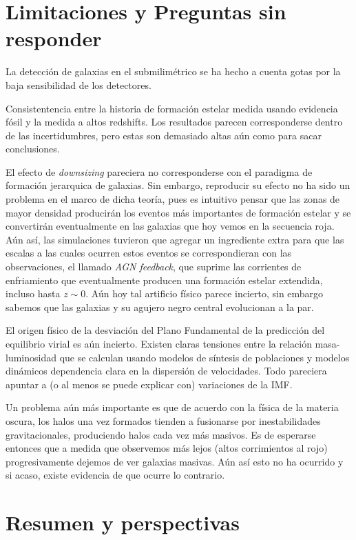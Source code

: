 \documentclass[a4paper,twoside]{article}
\begin{document}
\section{Limitaciones y Preguntas sin responder}

La detección de galaxias en el submilimétrico se ha hecho a cuenta gotas por la baja sensibilidad de los detectores.

Consistentencia entre la historia de formación estelar medida usando evidencia fósil y la medida a altos redshifts. Los resultados parecen corresponderse dentro de las incertidumbres, pero estas son demasiado altas aún como para sacar conclusiones.

El efecto de \emph{downsizing} pareciera no corresponderse con el paradigma de formación jerarquica de galaxias. Sin embargo, reproducir su efecto no ha sido un problema en el marco de dicha teoría, pues es intuitivo pensar que las zonas de mayor densidad producirán los eventos más importantes de formación estelar y se convertirán eventualmente en las galaxias que hoy vemos en la secuencia roja. Aún así, las simulaciones tuvieron que agregar un ingrediente extra para que las escalas a las cuales ocurren estos eventos se correspondieran con las observaciones, el llamado \emph{AGN feedback}, que suprime las corrientes de enfriamiento que eventualmente producen una formación estelar extendida, incluso hasta $z\sim0$. Aún hoy tal artificio físico parece incierto, sin embargo sabemos que las galaxias y su agujero negro central evolucionan a la par.

El origen físico de la desviación del Plano Fundamental de la predicción del equilibrio virial es aún incierto. Existen claras tensiones entre la relación masa-luminosidad que se calculan usando modelos de síntesis de poblaciones y modelos dinámicos dependencia clara en la dispersión de velocidades. Todo pareciera apuntar a (o al menos se puede explicar con) variaciones de la IMF.

Un problema aún más importante es que de acuerdo con la física de la materia oscura, los halos una vez formados tienden a fusionarse por inestabilidades gravitacionales, produciendo halos cada vez más masivos. Es de esperarse entonces que a medida que observemos más lejos (altos corrimientos al rojo) progresivamente dejemos de ver galaxias masivas. Aún así esto no ha ocurrido y si acaso, existe evidencia de que ocurre lo contrario.

\section{Resumen y perspectivas}
\end{document}

